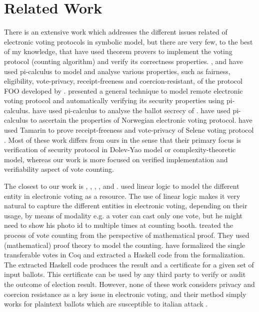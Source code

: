 \section{Related Work}
 There is an extensive work which 
 addresses the different issues related of electronic voting protocols  in symbolic model, 
 but there are very few, to the best of my knowledge, 
 that have used theorem provers to implement the voting protocol (counting algorithm)
 and verify its correctness properties. 
 \citep{10.1007/978-3-540-31987-0_14}, and  \citep{Delaune2010} have used pi-calculus to model 
 and analyse various properties, such as fairness, eligibility, vote-privacy, receipt-freeness and 
 coercion-resistant,  
 of the protocol FOO developed by \citep{10.1007/3-540-57220-1_66}.  \citep{Backes:2008:AVR:1380848.1381255}
 presented a general technique to model  remote electronic 
 voting protocol and automatically verifying  its security properties using pi-calculus. 
 \citep{5992139} have used pi-calculus to analyse the ballot secrecy of \citep{Helios:2016:HVS}.
 \citep{10.1007/978-3-642-28641-4_7} have used pi-calculus to ascertain the properties of 
 Norwegian electronic voting protocol.
 \citep{10.1007/978-3-319-68687-5_7} have used Tamarin  to prove receipt-freeness 
 and vote-privacy of Selene voting protocol \citep{Selene}.  Most of these work differs from ours
 in the sense that their primary focus is verification of security protocol in  
 Dolev-Yao model or  complexity-theoretic model, whereas our work is 
 more focused on verified implementation and  verifiability  aspect of vote counting.

 The closest to our work is \citep{DeYoung:2012:LLV}, \citep{Pattinson:2015:VCM}, \citep{Pattinson:2016:MSP},
 \citep{Verity:2017:FVI:3014812.3014845}, and \citep{Ghale:2017:FVS}.  \citep{DeYoung:2012:LLV} 
 used linear logic \citep{GIRARD19871} to model the different entity in electronic voting as a resource. 
 The use of linear logic makes it very natural to capture the different entities in electronic voting,  
 depending on their usage, by means of modality e.g. a voter can cast only one vote, but he might 
 need to show his photo id to multiple times at counting booth. \citep{Pattinson:2015:VCM} treated 
 the process of vote counting from
 the perspective of mathematical proof. They used (mathematical) proof theory to model the 
 counting. \citep{Ghale:2017:FVS} have formalized the single transferable votes in Coq and 
 extracted a Haskell code from the formalization. The extracted Haskell code produces the result 
 and a certificate for a given set of input ballots. This certificate can be used by any third party to verify 
 or audit the outcome of election result.  However, none of these work considers privacy and coercion resistance as a key 
 issue in electronic voting, and their method simply works for plaintext ballots which are  susceptible to 
 italian attack  \citep{Otten}   \citep{Benaloh:2009:SSC}.

